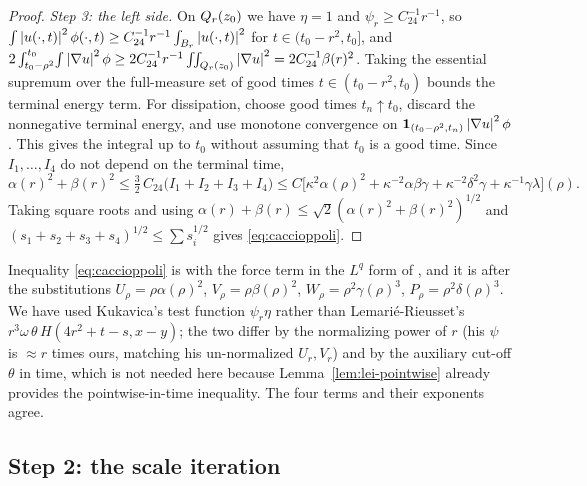 \documentclass[11pt,reqno]{amsart}
\begin{document}
\begin{proof}
\emph{Step 3: the left side.} On $Q_{r}(z_{0})$ we have $\eta=1$ and
$\psi_{r}\ge C_{24}^{-1}r^{-1}$, so
$\int\left\lvert u(\cdot,t) \right\rvert^{2}\phi(\cdot,t)\ge C_{24}^{-1}r^{-1}\int_{B_{r}}\left\lvert u(\cdot,t) \right\rvert^{2}$
for $t\in(t_{0}-r^{2},t_{0}]$, and
$2\int_{t_{0}-\rho^{2}}^{t_{0}}\!\int\left\lvert \nabla u \right\rvert^{2}\phi
 \ge2C_{24}^{-1}r^{-1}\iint_{Q_{r}(z_{0})}\left\lvert \nabla u \right\rvert^{2}
 =2C_{24}^{-1}\beta(r)^{2}$. Taking the essential supremum over the full-measure set of good times
$t\in(t_{0}-r^{2},t_{0})$ bounds the terminal energy term. For dissipation,
choose good times $t_n\uparrow t_0$, discard the nonnegative terminal
energy, and use monotone convergence on
$\mathbf1_{(t_0-\rho^2,t_n)}\left\lvert \nabla u \right\rvert^2\phi$.
This gives the integral up to $t_0$ without assuming that $t_0$ is a good
time. Since $I_1,\ldots,I_4$ do not depend on the terminal time,
\[
  \alpha(r)^{2}+\beta(r)^{2}
  \le \tfrac32\,C_{24}\bigl(I_{1}+I_{2}+I_{3}+I_{4}\bigr)
  \le C\bigl[\kappa^{2}\alpha(\rho)^{2}+\kappa^{-2}\alpha\beta\gamma
    +\kappa^{-2}\delta^{2}\gamma+\kappa^{-1}\gamma\lambda\bigr](\rho).
\]
Taking square roots and using
$\alpha(r)+\beta(r)\le\sqrt2(\alpha(r)^{2}+\beta(r)^{2})^{1/2}$ and
$(s_{1}+s_{2}+s_{3}+s_{4})^{1/2}\le\sum s_{i}^{1/2}$ gives
\eqref{eq:caccioppoli}.
\end{proof}

\begin{remark}\label{rem:caccioppoli-sources}
Inequality \eqref{eq:caccioppoli} is \cite[(2.18)]{Kukavica2008} with the force
term in the $L^{q}$ form of \cite[Theorem 2]{Kukavica2008}, and it is
\cite[(13.30)]{LemarieRieusset2016} after the substitutions
$U_{\rho}=\rho\alpha(\rho)^{2}$, $V_{\rho}=\rho\beta(\rho)^{2}$,
$W_{\rho}=\rho^{2}\gamma(\rho)^{3}$, $P_{\rho}=\rho^{2}\delta(\rho)^{3}$. We
have used Kukavica's test function $\psi_{r}\eta$ rather than Lemarié-Rieusset's
$r^{3}\omega\,\theta\,H(4r^{2}+t-s,x-y)$; the two differ by the normalizing
power of $r$ (his $\psi$ is $\approx r$ times ours, matching his un-normalized
$U_{r},V_{r}$) and by the auxiliary cut-off $\theta$ in time, which is not
needed here because Lemma~\ref{lem:lei-pointwise} already provides the
pointwise-in-time inequality. The four terms and their exponents agree.
\end{remark}

\subsection{Step 2: the scale iteration}\label{ss:step2}
\end{document}
